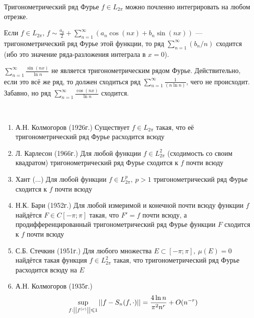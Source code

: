 \begin{corollary}
	Тригонометрический ряд Фурье $f \in L_{2\pi}$ можно почленно интегрировать на любом отрезке.
\end{corollary}

\begin{corollary}
	Если $f \in L_{2\pi}$, $f \sim \frac{a_0}{2} + \sum_{n = 1}^\infty (a_n\cos(nx) + b_n\sin(nx))$ --- тригонометрический ряд Фурье этой функции, то ряд $\sum_{n = 1}^\infty (b_n / n)$ сходится (ибо это значение ряда-разложения интеграла в $x = 0$).
\end{corollary}

\begin{example}
	$\sum_{n = 1}^\infty \frac{\sin(nx)}{\ln n}$ не является тригонометрическим рядом Фурье. Действительно, если это всё же ряд, то должен сходиться ряд $\sum_{n = 1}^\infty \frac{1}{(n\ln n)}$, чего не происходит. Забавно, но ряд $\sum_{n = 1}^\infty \frac{\cos(nx)}{\ln n}$ сходится.
\end{example}

\begin{note}~
	\begin{enumerate}
		\item А.Н. Колмогоров (1926г.) Существует $f \in L_{2\pi}$ такая, что её тригонометрический ряд Фурье расходится всюду
		
		\item Л. Карлесон (1966г.) Для любой функции $f \in L_{2\pi}^2$ (сходимость со своим квадратом) тригонометрический ряд Фурье сходится к $f$ почти всюду
		
		\item Хант (...) Для любой функции $f \in L_{2\pi}^p,\ p > 1$ тригонометрический ряд Фурье сходится к $f$ почти всюду
		
		\item Н.К. Бари (1952г.) Для любой измеримой и конечной почти всюду функции $f$ найдётся $F \in C[-\pi; \pi]$ такая, что $F' = f$ почти всюду, а продифференцированный тригонометрический ряд Фурье функции $F$ сходится к $f$ почти всюду
		
		\item С.Б. Стечкин (1951г.) Для любого множества $E \subset [-\pi; \pi],\ \mu(E) = 0$ найдётся такая функция $f \in L_{2\pi}^2$ такая, что тригонометрический ряд Фурье расходится всюду на $E$
		\item А.Н. Колмогоров (1935г.)
		\[
			\sup_{f : \left|\left|f^{(r)}\right|\right| \leqslant 1} \left|\left|f - S_n(f, \cdot)\right|\right| = \frac{4 \ln n}{\pi^2n^r} + O(n^{-r})
		\]
	\end{enumerate}
\end{note}

